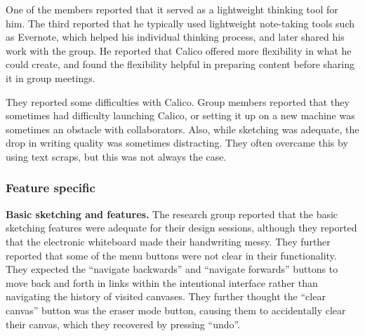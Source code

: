 \documentclass[12pt,fleqn]{ucithesis}
\begin{document}
One of the members reported that it served as a lightweight thinking tool for him. The third reported that he typically used lightweight note-taking tools such as Evernote, which helped his individual thinking process, and later shared his work with the group. He reported that Calico offered more flexibility in what he could create, and found the flexibility helpful in preparing content before sharing it in group meetings.


They reported some difficulties with Calico. Group members reported that they sometimes had difficulty launching Calico, or setting it up on a new machine was sometimes an obstacle with collaborators. Also, while sketching was adequate, the drop in writing quality was sometimes distracting. They often overcame this by using text scraps, but this was not always the case. 










\subsubsection{Feature specific}


\textbf{Basic sketching and features.} The research group reported that the basic sketching features were adequate for their design sessions, although they reported that the electronic whiteboard made their handwriting messy. They further reported that some of the menu buttons were not clear in their functionality. They expected the ``navigate backwards'' and ``navigate forwards'' buttons to move back and forth in links within the intentional interface rather than navigating the history of visited canvases. They further thought the ``clear canvas'' button was the eraser mode button, causing them to accidentally clear their canvas, which they recovered by pressing ``undo''.
\end{document}
